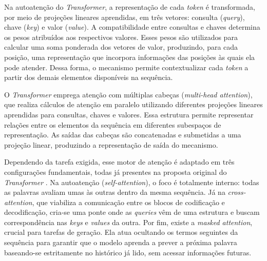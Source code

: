 

Na autoatenção do \textit{Transformer}, a representação de cada \textit{token} é transformada, por meio de projeções lineares aprendidas, em três vetores: consulta (\textit{query}), chave (\textit{key}) e valor (\textit{value}). A compatibilidade entre consultas e chaves determina os pesos atribuídos aos respectivos valores. Esses pesos são utilizados para calcular uma soma ponderada dos vetores de valor, produzindo, para cada posição, uma representação que incorpora informações das posições às quais ela pode atender. Dessa forma, o mecanismo permite contextualizar cada \textit{token} a partir dos demais elementos disponíveis na sequência.

O \textit{Transformer} emprega atenção com múltiplas cabeças (\textit{multi-head attention}), que realiza cálculos de atenção em paralelo utilizando diferentes projeções lineares aprendidas para consultas, chaves e valores. Essa estrutura permite representar relações entre os elementos da sequência em diferentes subespaços de representação. As saídas das cabeças são concatenadas e submetidas a uma projeção linear, produzindo a representação de saída do mecanismo.

Dependendo da tarefa exigida, esse motor de atenção é adaptado em três configurações fundamentais, todas já presentes na proposta original do \textit{Transformer} \cite{vaswani2017attention}. Na autoatenção (\textit{self-attention}), o foco é totalmente interno: todas as palavras avaliam umas às outras dentro da mesma sequência. Já na \textit{cross-attention}, que viabiliza a comunicação entre os blocos de codificação e decodificação, cria-se uma ponte onde as \textit{queries} vêm de uma estrutura e buscam correspondência nas \textit{keys} e \textit{values} da outra. Por fim, existe a \textit{masked attention}, crucial para tarefas de geração. Ela atua ocultando os termos seguintes da sequência para garantir que o modelo aprenda a prever a próxima palavra baseando-se estritamente no histórico já lido, sem acessar informações futuras.


